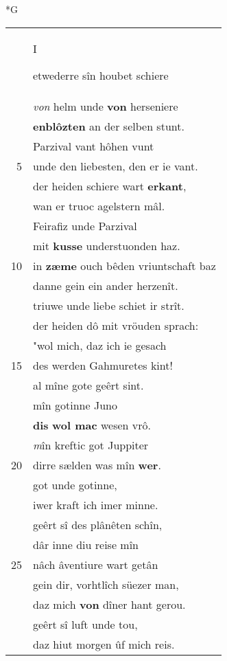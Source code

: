 \documentclass[8pt,a4paper,notitlepage]{article}
\begin{document}
\begin{table}[ht]
\begin{minipage}[t]{0.5\linewidth}
\small
\begin{center}*G
\end{center}
\begin{tabular}{rl}
 & \begin{large}I\end{large}etwederre sîn houbet schiere\\ 
 & \textit{von} helm unde \textbf{von} herseniere\\ 
 & \textbf{enblôzten} an der selben stunt.\\ 
 & Parzival vant hôhen vunt\\ 
5 & unde den liebesten, den er ie vant.\\ 
 & der heiden schiere wart \textbf{erkant},\\ 
 & wan er truoc agelstern mâl.\\ 
 & Feirafiz unde Parzival\\ 
 & mit \textbf{kusse} understuonden haz.\\ 
10 & in \textbf{zæme} ouch bêden vriuntschaft baz\\ 
 & danne gein ein ander herzenît.\\ 
 & triuwe unde liebe schiet ir strît.\\ 
 & der heiden dô mit vröuden sprach:\\ 
 & "wol mich, daz ich ie gesach\\ 
15 & des werden Gahmuretes kint!\\ 
 & al mîne gote geêrt sint.\\ 
 & mîn gotinne Juno\\ 
 & \textbf{dis} \textbf{wol mac} wesen vrô.\\ 
 & \textit{m}în kreftic got Juppiter\\ 
20 & dirre sælden was mîn \textbf{wer}.\\ 
 & got unde gotinne,\\ 
 & iwer kraft ich imer minne.\\ 
 & geêrt sî des plânêten schîn,\\ 
 & dâr inne diu reise mîn\\ 
25 & nâch âventiure wart getân\\ 
 & gein dir, vorhtlîch süezer man,\\ 
 & daz mich \textbf{von} dîner hant gerou.\\ 
 & geêrt sî luft unde tou,\\ 
 & daz hiut morgen ûf mich reis.\\ 

\end{tabular}
\end{minipage}
\end{table}
\end{document}
